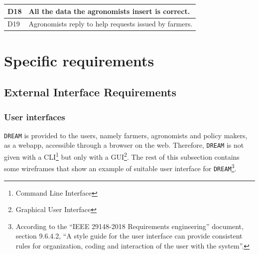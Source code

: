 \documentclass{article}
\begin{document}
\begin{longtable}[c]{|m{0.75cm}|m{11cm}|}
   \hline
  D18 & All the data the agronomists insert is correct.\\
  \hline
  D19 & Agronomists reply to help requests issued by farmers.\\
  \hline
  \end{longtable}
  \newpage
\section{Specific requirements}
\subsection{External Interface Requirements}
\subsubsection{User interfaces}
\verb|DREAM| is provided to the users, namely farmers, agronomists and policy makers, as a webapp, accessible through a browser on the web. Therefore, \verb|DREAM| is not given with a CLI\footnote{Command Line Interface} but only with a GUI\footnote{Graphical User Interface}. The rest of this subsection contains some wireframes that show an example of suitable user interface for \verb|DREAM|\footnote{According to the “IEEE 29148-2018 Requirements engineering” document, section 9.6.4.2, “A style guide for the user interface can provide consistent rules for organization, coding and interaction of the user with the system”.}.
\end{document}
